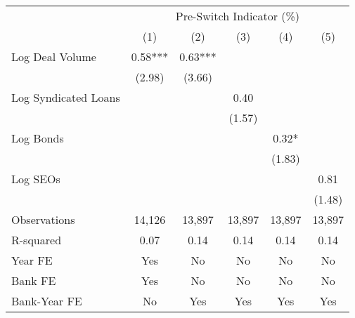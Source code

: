 {
\def\sym#1{\ifmmode^{#1}\else\(^{#1}\)\fi}
\begin{tabular*}{\hsize}{@{\hskip\tabcolsep\extracolsep\fill}l*{5}{c}}
\toprule
                &\multicolumn{5}{c}{Pre-Switch Indicator (\%)}                   \\\cmidrule(lr){2-6}
                &\multicolumn{1}{c}{(1)}   &\multicolumn{1}{c}{(2)}   &\multicolumn{1}{c}{(3)}   &\multicolumn{1}{c}{(4)}   &\multicolumn{1}{c}{(5)}   \\
\midrule
Log Deal Volume &     0.58***&     0.63***&            &            &            \\
                &   (2.98)   &   (3.66)   &            &            &            \\
 
Log Syndicated Loans&            &            &     0.40   &            &            \\
                &            &            &   (1.57)   &            &            \\
 
Log Bonds       &            &            &            &     0.32*  &            \\
                &            &            &            &   (1.83)   &            \\
 
Log SEOs        &            &            &            &            &     0.81   \\
                &            &            &            &            &   (1.48)   \\
\midrule
Observations    &   14,126   &   13,897   &   13,897   &   13,897   &   13,897   \\
R-squared       &     0.07   &     0.14   &     0.14   &     0.14   &     0.14   \\
\midrule Year FE &      Yes   &       No   &       No   &       No   &       No   \\
Bank FE         &      Yes   &       No   &       No   &       No   &       No   \\
Bank-Year FE    &       No   &      Yes   &      Yes   &      Yes   &      Yes   \\
\bottomrule
\end{tabular*}
}

